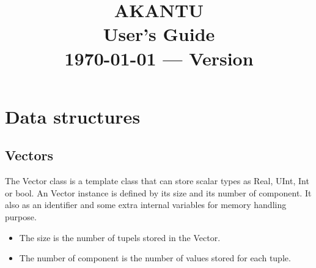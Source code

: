\documentclass[a4paper,11pt]{book}
\title{\textbf{\Huge AKANTU}\\
  \vspace{0.5cm}
  \textbf{\huge User's Guide}\\
  \vspace{1cm}
  {\small \today{} --- Version \version}
}
\date{}
\begin{document}
\maketitle

\tableofcontents

\chapter{Data structures\label{chap:data-structure}}

\section{Vectors\label{sec:vectors}}

The Vector class is a template class  that can store scalar types as Real, UInt,
Int  or bool.   An Vector  instance is  defined by  its size  and its  number of
component. It also as an identifier and some extra internal variables for memory
handling purpose.

\begin{itemize}
\item The size is the number of tupels stored in the Vector.
\item The number of component is the number of values stored for each tuple.
\end{itemize}
\end{document}
